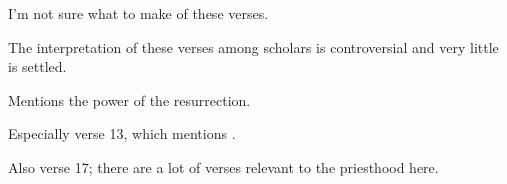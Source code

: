 \begin{compactdesc}
				\item[{\hyperref[PHILIPPIANS-2-5]{Philippians 2:5--11}}] \phantom{.}
					\begin{compactitem}
						\item I'm not sure what to make of these verses. 
						\item The interpretation of these verses among scholars is controversial and very little is settled.
					\end{compactitem}
				\item[{\hyperref[PHILIPPIANS-3-8]{Philippians 3:8--14}}] \phantom{.}
					\begin{compactitem}
						\item Mentions the power of the resurrection.
					\end{compactitem}
				\item[{\hyperref[COLOSSIANS-1-9]{Colossians 1:9--29}}] \phantom{.}
					\begin{compactitem}
						\item Especially verse 13, which mentions .
						\item Also verse 17; there are a lot of verses relevant to the priesthood here.
					\end{compactitem}
			\end{compactdesc}
			
		
			
				
		
